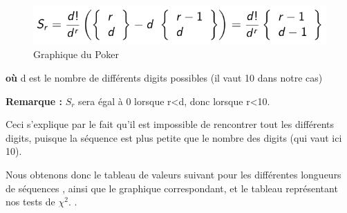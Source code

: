 \documentclass[10pt,a4paper]{article}
\begin{document}
\begin{figure}[h]
		\centering
\includegraphics[scale=0.4]{images/formule.png}  
\caption{Graphique du Poker}
	\end{figure}

\textbf{où} d est le nombre de différents digits possibles (il vaut 10 dans notre cas)

\textbf{Remarque :} $S_r$ sera égal à 0 lorsque r<d, donc lorsque r<10.

 

Ceci s'explique par le fait qu'il est impossible de rencontrer tout les différents digits, puisque la séquence est plus petite que le nombre des digits (qui vaut ici 10). 

Nous obtenons donc le tableau de valeurs suivant pour les différentes longueurs de séquences , ainsi que le graphique correspondant, et le tableau représentant nos tests de $\chi^2$. .

\newpage
\end{document}

